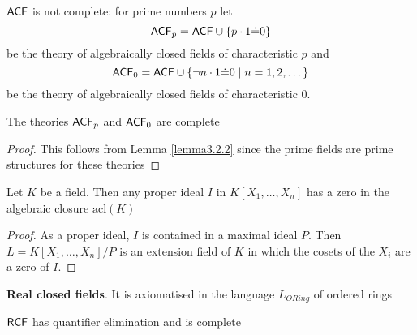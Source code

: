 \documentclass[11pt]{article}
\def \acl {\text{acl}}
\begin{document}
\(\textsf{ACF}\) is not complete: for prime numbers \(p\) let
\begin{equation*}
\textsf{ACF}_p=\textsf{ACF}\cup\{p\cdot 1\dot=0\}
\end{equation*}
be the theory of algebraically closed fields of characteristic \(p\) and
\begin{equation*}
\textsf{ACF}_0=\textsf{ACF}\cup\{\neg n\cdot 1\dot=0\mid n=1,2,\dots\}
\end{equation*}
be the theory of algebraically closed fields of characteristic 0.

\begin{corollary}[]
The theories \(\textsf{ACF}_p\)  and \(\textsf{ACF}_0\) are complete
\end{corollary}

\begin{proof}
This follows from Lemma \ref{lemma3.2.2} since the prime fields are prime structures for these theories
\end{proof}

\begin{corollary}
Let \(K\) be a field. Then any proper ideal \(I\) in \(K[X_1,\dots,X_n]\) has a zero in the algebraic
closure \(\acl(K)\)
\end{corollary}

\begin{proof}
As a proper ideal, \(I\) is contained in a maximal ideal \(P\). Then \(L=K[X_1,\dots,X_n]/P\) is an
extension field of \(K\) in which the cosets of the \(X_i\) are a zero of \(I\).
\end{proof}

\textbf{Real closed fields}. It is axiomatised in the language \(L_{ORing}\) of ordered rings

\begin{theorem}
\(\textsf{RCF}\) has quantifier elimination and is complete
\end{theorem}
\end{document}
